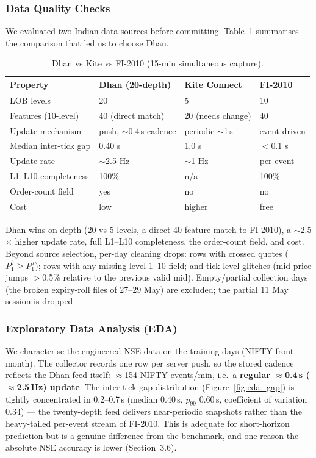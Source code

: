 \documentclass[11pt]{article}
\begin{document}
\subsubsection{Data Quality Checks}
We evaluated two Indian data sources before committing. Table~\ref{tab:dhanvskite} summarises the
comparison that led us to choose Dhan.
\begin{table}[h]
\centering
\caption{Dhan vs Kite vs FI-2010 (15-min simultaneous capture).}
\label{tab:dhanvskite}
\begin{tabular}{@{}llll@{}}
\toprule
Property & Dhan (20-depth) & Kite Connect & FI-2010 \\
\midrule
LOB levels & 20 & 5 & 10 \\
Features (10-level) & 40 (direct match) & 20 (needs change) & 40 \\
Update mechanism & push, $\sim$0.4\,s cadence & periodic $\sim$1\,s & event-driven \\
Median inter-tick gap & 0.40 s & 1.0 s & $<$0.1 s \\
Update rate & $\sim$2.5 Hz & $\sim$1 Hz & per-event \\
L1--L10 completeness & 100\% & n/a & 100\% \\
Order-count field & yes & no & no \\
Cost & low & higher & free \\
\bottomrule
\end{tabular}
\end{table}
Dhan wins on depth (20 vs 5 levels, a direct 40-feature match to FI-2010), a $\sim$2.5$\times$ higher update
rate, full L1--L10 completeness, the order-count field, and cost. Beyond source selection, per-day cleaning drops: rows with crossed quotes ($P^b_1\!\ge\!P^a_1$);
rows with any missing level-1--10 field; and tick-level glitches (mid-price jumps $>$0.5\% relative to the
previous valid mid). Empty/partial collection days (the broken expiry-roll files of 27--29 May) are
excluded; the partial 11 May session is dropped.

\subsubsection{Exploratory Data Analysis (EDA)}
We characterise the engineered NSE data on the training days (NIFTY front-month). The collector records one
row per server push, so the stored cadence reflects the Dhan feed itself: $\approx$154 NIFTY events/min,
i.e.\ a \textbf{regular $\approx$0.4\,s ($\approx$2.5\,Hz) update}. The inter-tick gap distribution
(Figure~\ref{fig:eda_gap}) is tightly concentrated in 0.2--0.7\,s (median 0.40\,s, $p_{99}$ 0.60\,s,
coefficient of variation $0.34$) --- the twenty-depth feed delivers near-periodic snapshots rather than the
heavy-tailed per-event stream of FI-2010. This is adequate for short-horizon prediction but is a genuine
difference from the benchmark, and one reason the absolute NSE accuracy is lower (Section~3.6).
\end{document}
